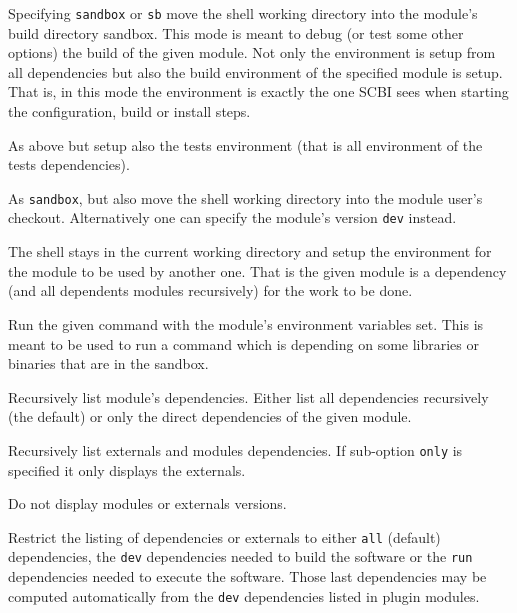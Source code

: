 \documentclass[a4paper,12pt,twoside]{article}
\newcommand{\code}[1]{\texttt{#1}}
\newcommand{\ddash}{-{}-}
\begin{document}
\begin{description}[font=\texttt]
	\begin{description}[font=\texttt]
		\item[sandbox] Specifying \code{sandbox} or \code{sb} move the shell working directory into the module's build directory sandbox. This mode is meant to debug (or test some other options) the build of the given module. Not only the environment is setup from all dependencies but also the build environment of the specified module is setup. That is, in this mode the environment is exactly the one SCBI sees when starting the configuration, build or install steps.

		\item[tests] As above but setup also the tests environment (that is all environment of the tests dependencies).

		\item[dev] As \code{sandbox}, but also move the shell working directory into the module user's checkout. Alternatively one can specify the module's version \code{dev} instead.

		\item[use|no sub-option] The shell stays in the current working directory and setup the environment for the module to be used by another one. That is the given module is a dependency (and all dependents modules recursively) for the work to be done.
	\end{description}

	\item[\ddash{}run:"command args..."] Run the given command with the module's environment variables set. This is meant to be used to run a command which is depending on some libraries or binaries that are in the sandbox.

	\item[\ddash{}list-depends:{[}direct|full{]}] Recursively list module's dependencies. Either list all dependencies recursively (the default) or only the direct dependencies of the given module.

	\item[\ddash{}list-externals:{[}only{]}] Recursively list externals and modules dependencies. If sub-option \code{only} is specified it only displays the externals.

	\item[\ddash{}list-no-version] Do not display modules or externals versions.

	\item[\ddash{}list-filter:{[}all|run|dev{]} ] Restrict the listing of dependencies or externals to either \code{all} (default) dependencies, the \code{dev} dependencies needed to build the software or the \code{run} dependencies needed to execute the software. Those last dependencies may be computed automatically from the \code{dev} dependencies listed in plugin modules.


\end{description}
\end{document}
